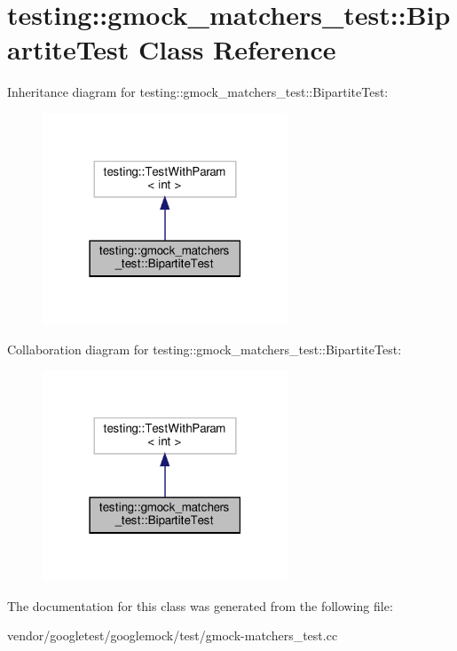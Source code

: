 \hypertarget{classtesting_1_1gmock__matchers__test_1_1_bipartite_test}{}\section{testing\+:\+:gmock\+\_\+matchers\+\_\+test\+:\+:Bipartite\+Test Class Reference}
\label{classtesting_1_1gmock__matchers__test_1_1_bipartite_test}


Inheritance diagram for testing\+:\+:gmock\+\_\+matchers\+\_\+test\+:\+:Bipartite\+Test\+:
\nopagebreak
\begin{figure}[H]
\begin{center}
\leavevmode
\includegraphics[width=207pt]{classtesting_1_1gmock__matchers__test_1_1_bipartite_test__inherit__graph}
\end{center}
\end{figure}


Collaboration diagram for testing\+:\+:gmock\+\_\+matchers\+\_\+test\+:\+:Bipartite\+Test\+:
\nopagebreak
\begin{figure}[H]
\begin{center}
\leavevmode
\includegraphics[width=207pt]{classtesting_1_1gmock__matchers__test_1_1_bipartite_test__coll__graph}
\end{center}
\end{figure}


The documentation for this class was generated from the following file\+:\begin{DoxyCompactItemize}
\item 
vendor/googletest/googlemock/test/gmock-\/matchers\+\_\+test.\+cc\end{DoxyCompactItemize}
